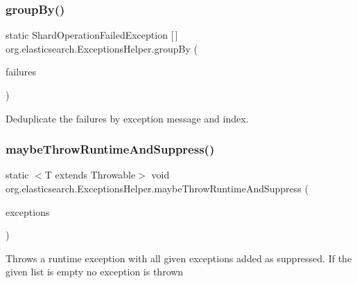 \subsubsection{\texorpdfstring{group\+By()}{groupBy()}}
{\footnotesize\ttfamily static Shard\+Operation\+Failed\+Exception \mbox{[}$\,$\mbox{]} org.\+elasticsearch.\+Exceptions\+Helper.\+group\+By (\begin{DoxyParamCaption}\item[{Shard\+Operation\+Failed\+Exception \mbox{[}$\,$\mbox{]}}]{failures }\end{DoxyParamCaption})\hspace{0.3cm}{\ttfamily [static]}}

Deduplicate the failures by exception message and index. \hypertarget{classorg_1_1elasticsearch_1_1_exceptions_helper_ad3418e31f771224486cce3bb9c1992ff}{}\label{classorg_1_1elasticsearch_1_1_exceptions_helper_ad3418e31f771224486cce3bb9c1992ff} 
\subsubsection{\texorpdfstring{maybe\+Throw\+Runtime\+And\+Suppress()}{maybeThrowRuntimeAndSuppress()}}
{\footnotesize\ttfamily static $<$T extends Throwable$>$ void org.\+elasticsearch.\+Exceptions\+Helper.\+maybe\+Throw\+Runtime\+And\+Suppress (\begin{DoxyParamCaption}\item[{List$<$ T $>$}]{exceptions }\end{DoxyParamCaption})\hspace{0.3cm}{\ttfamily [static]}}

Throws a runtime exception with all given exceptions added as suppressed. If the given list is empty no exception is thrown \hypertarget{classorg_1_1elasticsearch_1_1_exceptions_helper_acf6601d79d7aaa8791ecc8847a480e4f}{}\label{classorg_1_1elasticsearch_1_1_exceptions_helper_acf6601d79d7aaa8791ecc8847a480e4f} 
